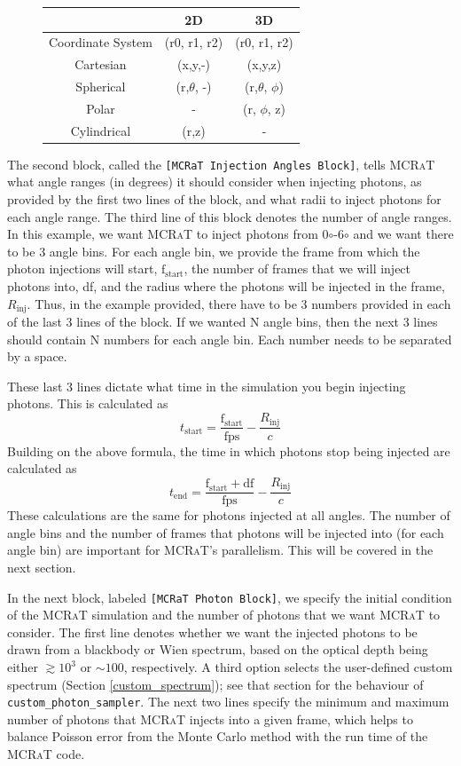 \documentclass[12pt,a4paper]{article}
\newcommand{\mcrat}{\textsc{MCRaT}}
\begin{document}
\begin{figure}[h!]
\centering
\begin{tabular}{|c|c|c|}
\hline
 & 2D & 3D \\
\hline
Coordinate System & (r0, r1, r2) & (r0, r1, r2) \\
\hline
Cartesian & (x,y,-) & (x,y,z) \\
\hline
Spherical & (r,$\theta$, -) & (r,$\theta$, $\phi$) \\
\hline
Polar & - & (r, $\phi$, z) \\
\hline
Cylindrical & (r,z) & - \\
\hline
\end{tabular}
\end{figure}

The second block, called the \texttt{[MCRaT Injection Angles Block]}, tells \mcrat{} what angle ranges (in degrees) it should consider when injecting photons, as provided by the first two lines of the block, and what radii to inject photons for each angle range. The third line of this block denotes the number of angle ranges. In this example, we want \mcrat{} to inject photons from 0$\circ$-6$\circ$ and we want there to be 3 angle bins. For each angle bin, we provide the frame from which the photon injections will start, $\mathrm{f_{start}}$, the number of frames that we will inject photons into, df, and the radius where the photons will be injected in the frame, $R_\mathrm{inj}$. Thus, in the example provided, there have to be 3 numbers provided in each of the last 3 lines of the block. If we wanted N angle bins, then the next 3 lines should contain N numbers for each angle bin. Each number needs to be separated by a space.

These last 3 lines dictate what time in the simulation you begin injecting photons. This is calculated as 
\[
t_\mathrm{start}=\frac{\mathrm{f_{start}}}{\mathrm{fps}}-\frac{R_\mathrm{inj}}{c}
\]
Building on the above formula, the time in which photons stop being injected are calculated as
\[
t_\mathrm{end}=\frac{\mathrm{f_{start}}+\mathrm{df}}{\mathrm{fps}}-\frac{R_\mathrm{inj}}{c}
\]
These calculations are the same for photons injected at all angles. The number of angle bins and the number of frames that photons will be injected into (for each angle bin) are important for \mcrat{}'s parallelism. This will be covered in the next section. 

In the next block, labeled \texttt{[MCRaT Photon Block]}, we specify the initial condition of the \mcrat{} simulation and the number of photons that we want \mcrat{} to consider. The first line denotes whether we want the injected photons to be drawn from a blackbody or Wien spectrum, based on the optical depth being either $\gtrsim 10^3$ or $\sim 100$, respectively. A third option selects the user-defined custom spectrum (Section \ref{custom_spectrum}); see that section for the behaviour of \texttt{custom\_photon\_sampler}. The next two lines specify the minimum and maximum number of photons that \mcrat{} injects into a given frame, which helps to balance Poisson error from the Monte Carlo method with the run time of the \mcrat{} code. 
\end{document}
